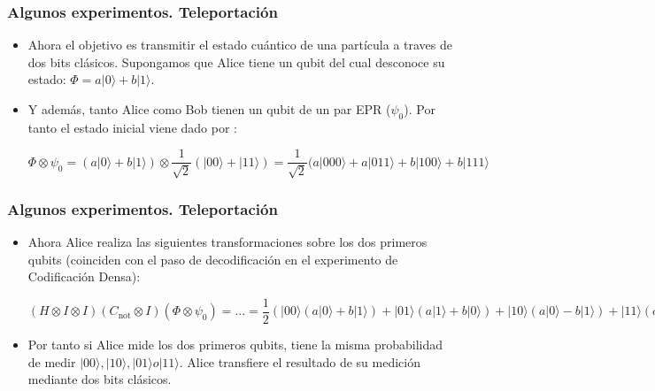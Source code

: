 \documentclass{beamer}
\newcommand{\base}[1]{|#1\rangle}
\newcommand{\cnot}{C_{\mathrm{not}}}
\begin{document}
\begin{frame}
	\frametitle{Algunos experimentos. Teleportación}
	\begin{itemize}
	\item Ahora el objetivo es transmitir el estado cuántico de una partícula a traves de dos bits clásicos. Supongamos que Alice tiene un qubit del cual desconoce su estado: $\Phi = a\base0 + b\base1$.
	\item Y además, tanto Alice como Bob tienen un qubit de un par EPR ($\psi_0$). Por tanto el estado inicial viene dado por : \\ 
	\begin{center}
	$\Phi \otimes \psi_0 =  (a\base0 + b\base1) \otimes\dfrac{1}{\sqrt{2}}(\base{00} + \base{11}) = \dfrac{1}{\sqrt{2}} (a\base{000} + a\base{011} + b\base{100} + b\base{111}$
	\end{center}
	\end{itemize}
\end{frame}

\begin{frame}
	\frametitle{Algunos experimentos. Teleportación}
	\begin{itemize}
	\item Ahora Alice realiza las siguientes transformaciones sobre los dos primeros qubits (coinciden con el paso de decodificación en el experimento de Codificación Densa):
	\begin{center}
	$ (H \otimes I \otimes I)(\cnot \otimes I) (\Phi \otimes \psi_0) = ... = \dfrac{1}{2}(\base{00}(a\base0 + b\base1) + \base{01}(a\base1 + b\base0) + \base{10}(a\base0 - b\base1) + 
	\base{11}(a\base1 - b\base0)) $ 
	\end{center}
	\item Por tanto si Alice mide los dos primeros qubits, tiene la misma probabilidad de medir $\base{00}, \base{10}, \base{01} o \base{11}$. Alice transfiere el resultado de su medición mediante 		dos bits clásicos.
	\end{itemize}
\end{frame}
\end{document}
